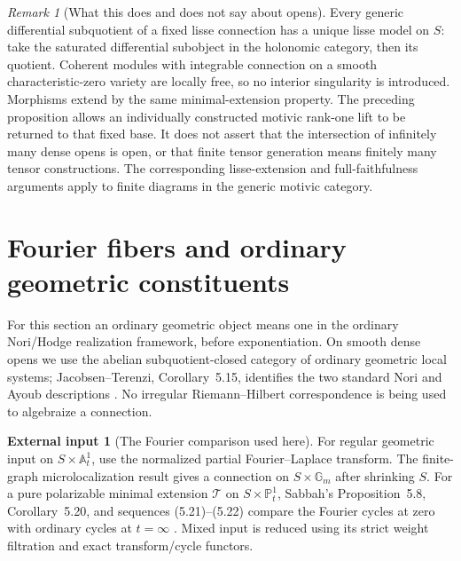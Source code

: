 \documentclass[11pt]{article}
\numberwithin{equation}{section}
\theoremstyle{definition}
\newtheorem{externalinput}[externalinput]{External input}
\theoremstyle{remark}
\newtheorem{remark}[remark]{Remark}
\newcommand{\A}{\mathbb A}
\newcommand{\Gm}{\mathbb G_m}
\begin{document}
\begin{remark}[What this does and does not say about opens]
Every generic differential subquotient of a fixed lisse connection has a
unique lisse model on $S$: take the saturated differential subobject in
the holonomic category, then its quotient. Coherent modules with integrable
connection on a smooth characteristic-zero variety are locally free, so
no interior singularity is introduced. Morphisms extend by the same
minimal-extension property. The preceding proposition allows an
individually constructed motivic rank-one lift to be returned to that
fixed base. It does not assert that the intersection of infinitely many
dense opens is open, or that finite tensor generation means finitely many
tensor constructions. The corresponding lisse-extension and full-faithfulness
arguments apply to finite diagrams in the generic motivic category.
\end{remark}

\section{Fourier fibers and ordinary geometric constituents}\label{sec:fourier}

For this section an ordinary geometric object means one in the ordinary
Nori/Hodge realization framework, before exponentiation. On smooth dense
opens we use the abelian subquotient-closed category of ordinary geometric
local systems; Jacobsen--Terenzi, Corollary~5.15, identifies the two standard
Nori and Ayoub descriptions \cite{JacobsenTerenzi}. No irregular
Riemann--Hilbert correspondence is being used to algebraize a connection.

\begin{externalinput}[The Fourier comparison used here]\label{input:fourier}
For regular geometric input on $S\times\A^1_t$, use the normalized
partial Fourier--Laplace transform. The finite-graph microlocalization
result gives a connection on $S\times\Gm$ after shrinking $S$.
For a pure polarizable minimal extension $\mathcal T$ on
$S\times\mathbb P^1_t$, Sabbah's Proposition~5.8, Corollary~5.20, and
sequences (5.21)--(5.22) compare the Fourier cycles at zero with ordinary
cycles at $t=\infty$ \cite{SabbahMonodromy}. Mixed input is reduced using
its strict weight filtration and exact transform/cycle functors.
\end{externalinput}
\end{document}
